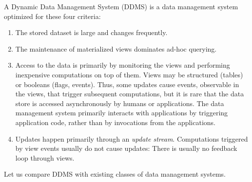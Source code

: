A Dynamic Data Management System (DDMS) is a
data management system optimized for these four criteria:\begin{enumerate}
\item
The stored dataset is large and changes frequently.

\item 
The
maintenance of materialized views dominates ad-hoc querying.

\item
Access to the data is primarily by monitoring the views and performing inexpensive computations on top of them.
%
%
Views may be structured (tables) or booleans (flags, events). Thus, some updates cause events, observable in the views, that trigger subsequent computations, but it is rare that the data store is accessed asynchronously by humans or applications. The data management system primarily interacts with applications by triggering application code, rather than by invocations from the applications.

\item
Updates happen primarily through an {\em update stream}\/. Computations triggered by view events usually do not cause updates: There is usually no feedback loop through views.
\end{enumerate}




Let us compare DDMS with existing classes of data management systems.

